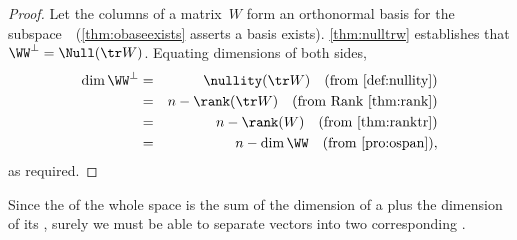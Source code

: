 \begin{reduce}
\begin{proof} 
Let the columns of a matrix~\(W\) form an orthonormal basis for the subspace~\WW\ (\autoref{thm:obaseexists} asserts a basis exists).
\autoref{thm:nulltrw} establishes that \(\WW^\perp=\Null(\tr W)\).
Equating dimensions of both sides, 
\begin{eqnarray*}
\dim\WW^\perp&=&\nullity(\tr W) 
\quad(\text{from \autoref{def:nullity}})
\\&=&n-\rank(\tr W)
\quad(\text{from Rank \autoref{thm:rank}})
\\&=&n-\rank(W)
\quad(\text{from \autoref{thm:ranktr}})
\\&=&n-\dim\WW
\quad(\text{from \autoref{pro:ospan}}),
\end{eqnarray*}
as required.
\end{proof}


Since the  of the whole space is the sum of the dimension of a  plus the dimension of its , surely we must be able to separate vectors into two corresponding .


\end{reduce}
